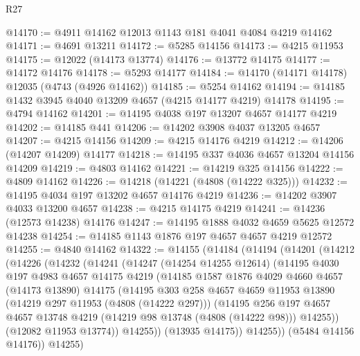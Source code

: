 \begin{lexlean}{R27}
\begin{coremodule}
@14170 := @4911 @14162 @12013 @1143 @181 @4041 @4084 @4219 @14162
@14171 := @4691 @13211
@14172 := @5285 @14156
@14173 := @4215 @11953
@14175 := @12022 (@14173 @13774)
@14176 := @13772 @14175
@14177 := @14172 @14176
@14178 := @5293 @14177
@14184 := @14170 (@14171 @14178) @12035 (@4743 (@4926 @14162))
@14185 := @5254 @14162
@14194 := @14185 @1432 @3945 @4040 @13209 @4657 (@4215 @14177 @4219) @14178
@14195 := @4794 @14162
@14201 := @14195 @4038 @197 @13207 @4657 @14177 @4219
@14202 := @14185 @441
@14206 := @14202 @3908 @4037 @13205 @4657
@14207 := @4215 @14156
@14209 := @4215 @14176 @4219
@14212 := @14206 (@14207 @14209) @14177
@14218 := @14195 @337 @4036 @4657 @13204 @14156 @14209
@14219 := @4803 @14162
@14221 := @14219 @325 @14156
@14222 := @4809 @14162
@14226 := @14218 (@14221 (@4808 (@14222 @325)))
@14232 := @14195 @4034 @197 @13202 @4657 @14176 @4219
@14236 := @14202 @3907 @4033 @13200 @4657
@14238 := @4215 @14175 @4219
@14241 := @14236 (@12573 @14238) @14176
@14247 := @14195 @1888 @4032 @4659 @5625 @12572 @14238
@14254 := @14185 @1143 @1876 @197 @4657 @4657 @4219 @12572
@14255 := @4840 @14162
@14322 := @14155
    (@14184
      (@14194
        (@14201
          (@14212
            (@14226
              (@14232
                (@14241
                  (@14247
                    (@14254 @14255 @12614)
                    (@14195
                      @4030
                      @197
                      @4983
                      @4657
                      @14175
                      @4219
                      (@14185
                        @1587
                        @1876
                        @4029
                        @4660
                        @4657
                        (@14173 @13890)
                        @14175
                        (@14195
                          @303
                          @258
                          @4657
                          @4659
                          @11953
                          @13890
                          (@14219 @297 @11953 (@4808 (@14222 @297)))
                          (@14195
                            @256
                            @197
                            @4657
                            @4657
                            @13748
                            @4219
                            (@14219 @98 @13748 (@4808 (@14222 @98)))
                            @14255))
                        (@12082 @11953 @13774))
                      @14255))
                  (@13935 @14175))
                @14255))
            (@5484 @14156 @14176))
          @14255)

\end{coremodule}
\end{lexlean}
